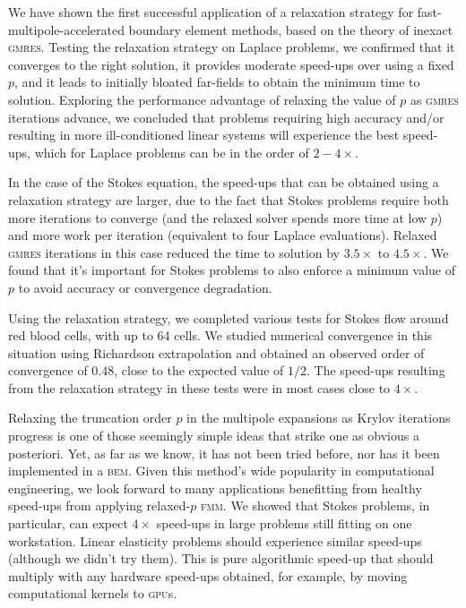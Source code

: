 \documentclass[final,leqno,]{siamltex1213}
\newcommand{\gpu}{\textsc{gpu}}
\newcommand{\bem}{\textsc{bem}\xspace}
\newcommand{\fmm}{\textsc{fmm}\xspace}
\newcommand{\gmres}{\textsc{gmres}\xspace}
\begin{document}
We have shown the first successful application of a relaxation strategy for fast-multipole-accelerated boundary element methods, based on the theory of inexact \gmres. Testing the relaxation strategy on Laplace problems, we confirmed that it converges to the right solution, it provides moderate speed-ups over using a fixed $p$, and it leads to initially bloated far-fields to obtain the minimum time to solution.
Exploring the performance advantage of relaxing the value of $p$ as \gmres iterations advance, we concluded that problems requiring high accuracy and/or resulting in more ill-conditioned linear systems will experience the best speed-ups, which for Laplace problems can be in the order of $2-4\times$.

In the case of the Stokes equation, the speed-ups that can be obtained using a relaxation strategy are larger, due to the fact that Stokes problems require both more iterations to converge (and the relaxed solver spends more time at low $p$) and more work per iteration (equivalent to four Laplace evaluations). Relaxed \gmres iterations in this case reduced the time to solution by $3.5\times$ to $4.5\times$. We found that it's important for Stokes problems to also enforce a minimum value of $p$ to avoid accuracy or convergence degradation.

Using the relaxation strategy, we completed various tests for Stokes flow around red blood cells, with up to 64 cells. We studied numerical convergence in this situation using Richardson extrapolation and obtained an observed order of convergence of $0.48$, close to the expected value of $1/2$. The speed-ups resulting from the relaxation strategy in these tests were in most cases close to $4\times$.

Relaxing the truncation order $p$ in the multipole expansions as Krylov iterations progress is one of those seemingly simple ideas that strike one as obvious a posteriori. Yet, as far as we know, it has not been tried before, nor has it been implemented in a \bem. Given this method's wide popularity in computational engineering, we look forward to many applications benefitting from healthy speed-ups from applying relaxed-$p$ \fmm. We  showed that Stokes problems, in particular, can expect $4\times$ speed-ups in large problems still fitting on one workstation. Linear elasticity problems should experience similar speed-ups (although we didn't try them). This is pure algorithmic speed-up that should multiply with any hardware speed-ups obtained, for example, by moving computational kernels to \gpu s.
\end{document}
